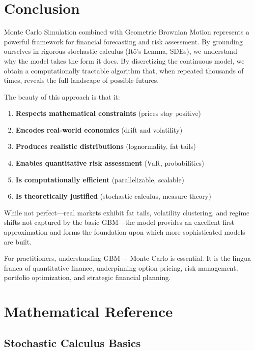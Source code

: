 \documentclass[12pt,a4paper]{article}
\begin{document}
\section{Conclusion}

Monte Carlo Simulation combined with Geometric Brownian Motion represents a powerful framework for financial forecasting and risk assessment. By grounding ourselves in rigorous stochastic calculus (Itô's Lemma, SDEs), we understand why the model takes the form it does. By discretizing the continuous model, we obtain a computationally tractable algorithm that, when repeated thousands of times, reveals the full landscape of possible futures.

The beauty of this approach is that it:

\begin{enumerate}
    \item \textbf{Respects mathematical constraints} (prices stay positive)
    \item \textbf{Encodes real-world economics} (drift and volatility)
    \item \textbf{Produces realistic distributions} (lognormality, fat tails)
    \item \textbf{Enables quantitative risk assessment} (VaR, probabilities)
    \item \textbf{Is computationally efficient} (parallelizable, scalable)
    \item \textbf{Is theoretically justified} (stochastic calculus, measure theory)
\end{enumerate}

While not perfect—real markets exhibit fat tails, volatility clustering, and regime shifts not captured by the basic GBM—the model provides an excellent first approximation and forms the foundation upon which more sophisticated models are built.

For practitioners, understanding GBM + Monte Carlo is essential. It is the lingua franca of quantitative finance, underpinning option pricing, risk management, portfolio optimization, and strategic financial planning.

\newpage

\appendix

\section{Mathematical Reference}

\subsection{Stochastic Calculus Basics}
\end{document}
